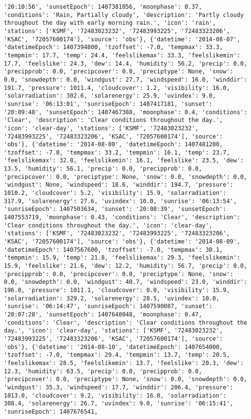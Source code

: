 \documentclass[
  letterpaper,
  DIV=11,
  numbers=noendperiod]{scrartcl}
\begin{document}
\begin{verbatim}
'20:10:56', 'sunsetEpoch': 1407381056, 'moonphase': 0.37, 'conditions': 'Rain, Partially cloudy', 'description': 'Partly cloudy throughout the day with early morning rain.', 'icon': 'rain', 'stations': ['KSMF', '72483023232', '72483993225', '72483323206', 'KSAC', '72057600174'], 'source': 'obs'}, {'datetime': '2014-08-07', 'datetimeEpoch': 1407394800, 'tzoffset': -7.0, 'tempmax': 33.3, 'tempmin': 17.7, 'temp': 24.4, 'feelslikemax': 33.3, 'feelslikemin': 17.7, 'feelslike': 24.3, 'dew': 14.4, 'humidity': 56.2, 'precip': 0.0, 'precipprob': 0.0, 'precipcover': 0.0, 'preciptype': None, 'snow': 0.0, 'snowdepth': 0.0, 'windgust': 27.7, 'windspeed': 16.0, 'winddir': 191.7, 'pressure': 1011.4, 'cloudcover': 1.2, 'visibility': 16.0, 'solarradiation': 302.6, 'solarenergy': 25.9, 'uvindex': 9.0, 'sunrise': '06:13:01', 'sunriseEpoch': 1407417181, 'sunset': '20:09:48', 'sunsetEpoch': 1407467388, 'moonphase': 0.4, 'conditions': 'Clear', 'description': 'Clear conditions throughout the day.', 'icon': 'clear-day', 'stations': ['KSMF', '72483023232', '72483993225', '72483323206', 'KSAC', '72057600174'], 'source': 'obs'}, {'datetime': '2014-08-08', 'datetimeEpoch': 1407481200, 'tzoffset': -7.0, 'tempmax': 33.2, 'tempmin': 16.1, 'temp': 23.7, 'feelslikemax': 32.8, 'feelslikemin': 16.1, 'feelslike': 23.5, 'dew': 13.5, 'humidity': 56.1, 'precip': 0.0, 'precipprob': 0.0, 'precipcover': 0.0, 'preciptype': None, 'snow': 0.0, 'snowdepth': 0.0, 'windgust': None, 'windspeed': 18.6, 'winddir': 194.7, 'pressure': 1010.2, 'cloudcover': 5.2, 'visibility': 15.9, 'solarradiation': 317.9, 'solarenergy': 27.6, 'uvindex': 10.0, 'sunrise': '06:13:54', 'sunriseEpoch': 1407503634, 'sunset': '20:08:39', 'sunsetEpoch': 1407553719, 'moonphase': 0.43, 'conditions': 'Clear', 'description': 'Clear conditions throughout the day.', 'icon': 'clear-day', 'stations': ['KSMF', '72483023232', '72483993225', '72483323206', 'KSAC', '72057600174'], 'source': 'obs'}, {'datetime': '2014-08-09', 'datetimeEpoch': 1407567600, 'tzoffset': -7.0, 'tempmax': 30.1, 'tempmin': 15.9, 'temp': 21.8, 'feelslikemax': 29.3, 'feelslikemin': 15.9, 'feelslike': 21.6, 'dew': 12.2, 'humidity': 56.7, 'precip': 0.0, 'precipprob': 0.0, 'precipcover': 0.0, 'preciptype': None, 'snow': 0.0, 'snowdepth': 0.0, 'windgust': 40.7, 'windspeed': 23.0, 'winddir': 196.0, 'pressure': 1011.1, 'cloudcover': 0.0, 'visibility': 15.9, 'solarradiation': 329.2, 'solarenergy': 28.5, 'uvindex': 10.0, 'sunrise': '06:14:47', 'sunriseEpoch': 1407590087, 'sunset': '20:07:28', 'sunsetEpoch': 1407640048, 'moonphase': 0.47, 'conditions': 'Clear', 'description': 'Clear conditions throughout the day.', 'icon': 'clear-day', 'stations': ['KSMF', '72483023232', '72483993225', '72483323206', 'KSAC', '72057600174'], 'source': 'obs'}, {'datetime': '2014-08-10', 'datetimeEpoch': 1407654000, 'tzoffset': -7.0, 'tempmax': 29.4, 'tempmin': 13.7, 'temp': 20.5, 'feelslikemax': 28.5, 'feelslikemin': 13.7, 'feelslike': 20.3, 'dew': 12.3, 'humidity': 63.5, 'precip': 0.0, 'precipprob': 0.0, 'precipcover': 0.0, 'preciptype': None, 'snow': 0.0, 'snowdepth': 0.0, 'windgust': 35.3, 'windspeed': 17.7, 'winddir': 206.4, 'pressure': 1013.0, 'cloudcover': 9.2, 'visibility': 16.0, 'solarradiation': 308.4, 'solarenergy': 26.7, 'uvindex': 9.0, 'sunrise': '06:15:41', 'sunriseEpoch': 1407676541, 
\end{verbatim}
\end{document}
